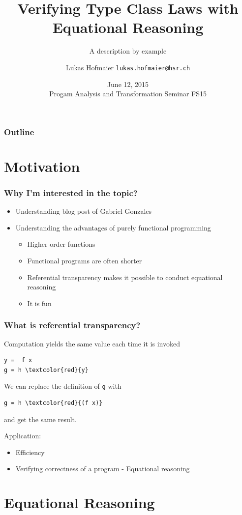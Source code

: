 \documentclass{beamer}
\title{Verifying Type Class Laws with Equational Reasoning}
\subtitle{A description by example}
\author{Lukas Hofmaier \texttt{lukas.hofmaier@hsr.ch}}
\date{June 12, 2015 \\ Progam Analysis and Transformation Seminar FS15}
\begin{document}
\maketitle
\begin{frame}
  \frametitle{Outline}
  \tableofcontents
\end{frame}

\section{Motivation}

\begin{frame}
  \frametitle{Why I'm interested in the topic?}
\begin{itemize}
\item Understanding blog post of Gabriel Gonzales
\item Understanding the advantages of purely functional programming
  \begin{itemize}
  \item Higher order functions
  \item Functional programs are often shorter
  \item {\color{red} Referential transparency makes it possible to conduct equational reasoning}
  \item It is fun
  \end{itemize}
\end{itemize}
\end{frame}

\begin{frame}[fragile]
\frametitle{What is referential transparency?}
Computation yields the same value each time it is invoked
\begin{Verbatim}[commandchars=\\\{\}]
y =  f x
g = h \textcolor{red}{y} 
\end{Verbatim}
We can replace the definition of \verb|g| with
\begin{Verbatim}[commandchars=\\\{\}]
g = h \textcolor{red}{(f x)}
\end{Verbatim}
and get the same result.

Application:
\begin{itemize}
\item Efficiency
\item Verifying correctness of a program - Equational reasoning
\end{itemize}
\end{frame}
\section{Equational Reasoning}
\end{document}
